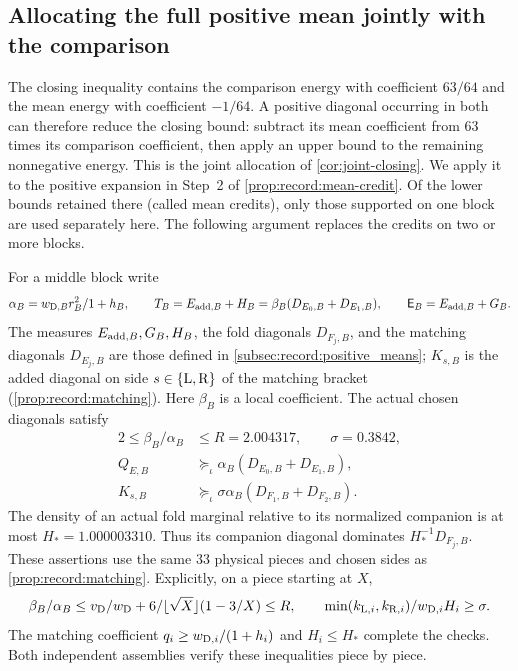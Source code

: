 \subsection{Allocating the full positive mean jointly with the comparison}
\label{subsec:joint-mean}

The closing inequality contains the comparison energy with coefficient
$63/64$ and the mean energy with coefficient $-1/64$. A positive
diagonal occurring in both can therefore reduce the closing bound:
subtract its mean coefficient from $63$ times its comparison coefficient,
then apply an upper bound to the remaining nonnegative energy.
This is the joint allocation of \cref{cor:joint-closing}.
We apply it to the positive expansion in Step~2 of
\cref{prop:record:mean-credit}. Of the lower bounds retained there
(called mean credits), only those supported on one block are used
separately here. The following argument replaces the credits on
two or more blocks.

For a middle block write
\[
 \alpha_B=\frac{w_{{\rm D},B}r_B^2}{1+h_B},\qquad
 T_B=E_{{\rm add},B}+H_B
     =\beta_B(D_{E_0,B}+D_{E_1,B}),\qquad
 \mathsf E_B=E_{{\rm add},B}+G_B.
\]
The measures $E_{{\rm add},B},G_B,H_B$, the fold diagonals $D_{F_j,B}$,
and the matching diagonals $D_{E_j,B}$ are those defined in
\cref{subsec:record:positive_means}; $K_{s,B}$ is the added diagonal
on side $s\in\{{\rm L},{\rm R}\}$ of the matching bracket
(\cref{prop:record:matching}). Here $\beta_B$ is a local coefficient.
The actual chosen diagonals satisfy
\begin{equation}\label{eq:joint-resources}
 \begin{aligned}
 2\le\beta_B/\alpha_B&\le R=2.004317,\qquad\sigma=0.3842,\\
 Q_{E,B}&\succeq_\iota\alpha_B(D_{E_0,B}+D_{E_1,B}),\\
 K_{s,B}&\succeq_\iota\sigma\alpha_B(D_{F_1,B}+D_{F_2,B}).
 \end{aligned}
\end{equation}
The density of an actual fold marginal relative to its normalized
companion is at most $H_*=1.000003310$. Thus its companion diagonal
dominates $H_*^{-1}D_{F_j,B}$.
These assertions use the same $33$ physical pieces and chosen sides
as \cref{prop:record:matching}. Explicitly, on a piece starting at $X$,
\[
 \frac{\beta_B}{\alpha_B}
 \le\frac{v_{\rm D}}{w_{\rm D}}
       +\frac{6}{\lfloor\sqrt X\rfloor(1-3/X)}\le R,
 \qquad
 \frac{\min(k_{{\rm L},i},k_{{\rm R},i})}{w_{{\rm D},i}H_i}\ge\sigma.
\]
The matching coefficient $q_i\ge w_{{\rm D},i}/(1+h_i)$ and
$H_i\le H_*$ complete the checks. Both independent assemblies verify
these inequalities piece by piece.

